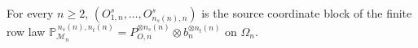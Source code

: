 For every \(n\ge2\), \((O^s_{1,n},\ldots,O^s_{n_s(n),n})\) is the source coordinate block of the finite row law \(\mathbb P_{\mathcal M_n}^{\,n_s(n),n_t(n)}=P_{O,n}^{\otimes n_s(n)}\otimes b_n^{\otimes n_t(n)}\) on \(\Omega_n\).